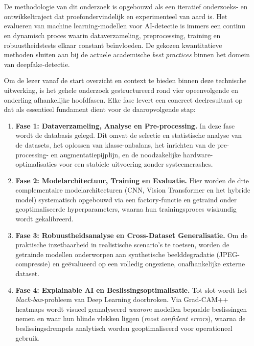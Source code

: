 
\chapter{}%
\label{ch:methodologie}

De methodologie van dit onderzoek is opgebouwd als een iteratief onderzoeks- en ontwikkeltraject dat proefondervindelijk en experimenteel van aard is. Het evalueren van machine learning-modellen voor AI-detectie is immers een continu en dynamisch proces waarin dataverzameling, preprocessing, training en robuustheidstests elkaar constant beïnvloeden. De gekozen kwantitatieve methoden sluiten aan bij de actuele academische \emph{best practices} binnen het domein van deepfake-detectie.

Om de lezer vanaf de start overzicht en context te bieden binnen deze technische uitwerking, is het gehele onderzoek gestructureerd rond vier opeenvolgende en onderling afhankelijke hoofdfasen. Elke fase levert een concreet deelresultaat op dat als essentieel fundament dient voor de daaropvolgende stap:

\begin{enumerate}
    \item \textbf{Fase 1: Dataverzameling, Analyse en Pre-processing.} In deze fase wordt de databasis gelegd. Dit omvat de selectie en statistische analyse van de datasets, het oplossen van klasse-onbalans, het inrichten van de pre-processing- en augmentatiepijplijn, en de noodzakelijke hardware-optimalisaties voor een stabiele uitvoering zonder systeemcrashes.
    \item \textbf{Fase 2: Modelarchitectuur, Training en Evaluatie.} Hier worden de drie complementaire modelarchitecturen (CNN, Vision Transformer en het hybride model) systematisch opgebouwd via een factory-functie en getraind onder geoptimaliseerde hyperparameters, waarna hun trainingsproces wiskundig wordt gekalibreerd.
    \item \textbf{Fase 3: Robuustheidsanalyse en Cross-Dataset Generalisatie.} Om de praktische inzetbaarheid in realistische scenario's te toetsen, worden de getrainde modellen onderworpen aan synthetische beelddegradatie (JPEG-compressie) en geëvalueerd op een volledig ongeziene, onafhankelijke externe dataset.
    \item \textbf{Fase 4: Explainable AI en Beslissingsoptimalisatie.} Tot slot wordt het \emph{black-box}-probleem van Deep Learning doorbroken. Via Grad-CAM++ heatmaps wordt visueel geanalyseerd \textit{waarom} modellen bepaalde beslissingen nemen en waar hun blinde vlekken liggen (\emph{most confident errors}), waarna de beslissingsdrempels analytisch worden geoptimaliseerd voor operationeel gebruik.
\end{enumerate}

